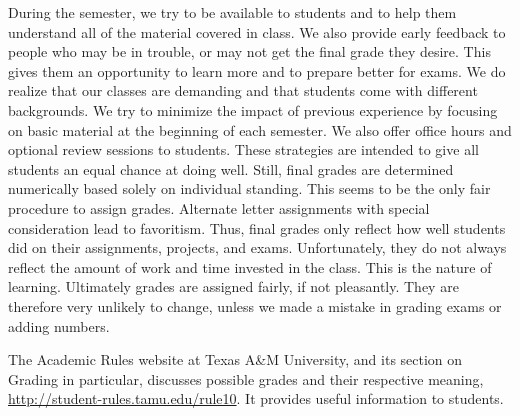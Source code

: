 \documentclass{article}
\begin{document}
During the semester, we try to be available to students and to help them understand all of the material covered in class.
We also provide early feedback to people who may be in trouble, or may not get the final grade they desire.
This gives them an opportunity to learn more and to prepare better for exams.
We do realize that our classes are demanding and that students come with different backgrounds.
We try to minimize the impact of previous experience by focusing on basic material at the beginning of each semester.
We also offer office hours and optional review sessions to students.
These strategies are intended to give all students an equal chance at doing well.
Still, final grades are determined numerically based solely on individual standing.
This seems to be the only fair procedure to assign grades.
Alternate letter assignments with special consideration lead to favoritism.
Thus, final grades only reflect how well students did on their assignments, projects, and exams.
Unfortunately, they do not always reflect the amount of work and time invested in the class.
This is the nature of learning.
Ultimately grades are assigned fairly, if not pleasantly.
They are therefore very unlikely to change, unless we made a mistake in grading exams or adding numbers.

The Academic Rules website at Texas A\&M University, and its section on Grading in particular, discusses possible grades and their respective meaning,
\url{http://student-rules.tamu.edu/rule10}.
It provides useful information to students.
\end{document}
